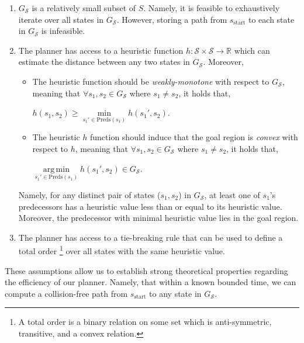 \documentclass[letterpaper]{article} %
\newcommand{\calS}{\ensuremath{\mathcal{S}}\xspace}
\newcommand{\sStart}{\ensuremath{s_{\text{start}}\xspace}}
\DeclareMathOperator*{\argmin}{arg\,min}
\begin{document}
\begin{enumerate}[label={\textbf{A\arabic*}}]
  \item \label{assum:1} $G_\calS$ is a relatively small subset of $S$. Namely, it is feasible to exhaustively iterate over all states in $G_\calS$.
However, storing a path from $\sStart$ to each state in $G_\calS$ is infeasible.
  
  \item \label{assum:2} The planner has access to a heuristic function $h: \calS \times \calS \rightarrow \mathbb{R}$ which can estimate the distance between any two states in $G_\calS$. Moreover, 
 \begin{itemize}
 	\item The heuristic function should be \textit{weakly-monotone} with respect to $G_\calS$, meaning that $\forall s_1, s_2  \in G_\calS$ where $s_1 \neq s_2 $, it holds that,
  \begin{center}
    $h(s_1, s_2) \geq \min\limits_{s_1' \in \text{Preds}(s_1)} h(s_1', s_2)$.
  \end{center}

	\item The heuristic $h$ function should induce that the goal region is \emph{convex} with respect to $h$, meaning that $\forall s_1, s_2  \in G_\calS$ where $s_1 \neq s_2 $, it holds that,
  \begin{center}
     $\argmin\limits_{s_1' \in \text{Preds}(s_1)} h(s_1', s_2) \in G_\calS$.
  \end{center}

 \end{itemize}
 Namely, for any distinct pair of states ($s_1, s_2$) in $G_\calS$, at least one of $s_1$'s predecessors has a heuristic value less than or equal to its heuristic value.
 Moreover, the predecessor with minimal heuristic value lies in the goal region.


  \item \label{assum:3} The planner has access to a tie-breaking rule that can be used to define a total order \footnote{A total order is a binary relation on some set which is anti-symmetric, transitive, and a convex relation.} over all states with the same heuristic value.
  \end{enumerate}

These assumptions allow us to establish strong theoretical properties regarding the efficiency of our planner. Namely, that
within a known bounded time, we can compute a collision-free path from $\sStart$ to any state in $G_\calS$. 
\end{document}
